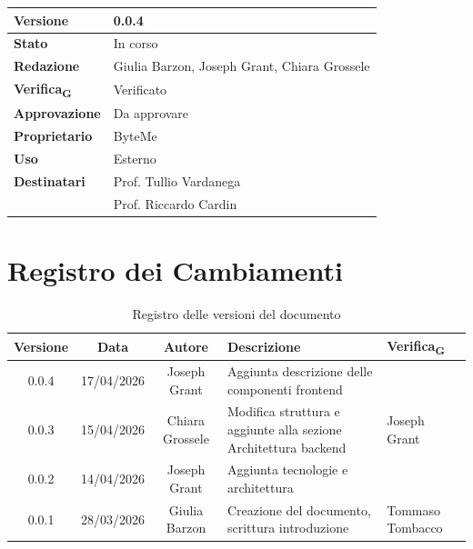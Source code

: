 \documentclass[11pt,a4paper]{article}
\newcommand{\gls}[1]{#1\textsubscript{G}}
\begin{document}
\begin{titlepage}
    \begin{table}[H]
        \centering
        \begin{tabular}{|l|p{5cm}|}
            \hline
            \textbf{Versione} & 0.0.4 \\
            \hline
            \textbf{Stato} & In corso \\
            \hline
            \textbf{Redazione} & Giulia Barzon, Joseph Grant, Chiara Grossele \\
            \hline
            \textbf{\gls{Verifica}} & Verificato \\
            \hline
            \textbf{Approvazione} & Da approvare\\
            \hline
            \textbf{Proprietario} & ByteMe \\
            \hline
            \textbf{Uso} & Esterno \\
            \hline
            \textbf{Destinatari} & Prof. Tullio Vardanega \\ & Prof. Riccardo Cardin \\
            \hline
        \end{tabular}
    \end{table}
    
    \vfill
\end{titlepage}

\thispagestyle{empty}
\section*{Registro dei Cambiamenti}

\begin{table}[H]
    \centering
    \begin{tabular}{|c|c|c|>{\raggedright\arraybackslash}p{}|p{}|}
        \hline
        \textbf{Versione} & \textbf{Data} & \textbf{Autore} & \textbf{Descrizione} & \textbf{\gls{Verifica}} \\
        \hline
        0.0.4 & 17/04/2026 & Joseph Grant & Aggiunta descrizione delle componenti frontend & \\
        \hline
        0.0.3 & 15/04/2026 & Chiara Grossele & Modifica struttura e aggiunte alla sezione Architettura backend& Joseph Grant\\
        \hline
        0.0.2 & 14/04/2026 & Joseph Grant & Aggiunta tecnologie e architettura & \\
        \hline
        0.0.1 & 28/03/2026 & Giulia Barzon & Creazione del documento, scrittura introduzione & Tommaso Tombacco \\
        \hline
    \end{tabular}
    \caption{Registro delle versioni del documento}
    \label{tab:versionamento}
\end{table}
\newpage
\end{document}
